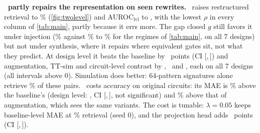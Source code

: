 \noindent\textbf{\ours\ partly repairs the representation on seen rewrites.} \ours\ raises restructured retrieval to
\OursTopRS\% (\cref{fig:twolevel}) and AUROC$_\mathrm{lvl}$ to \OursAUCHard, with the lowest $\rho$ in every column of \cref{tab:main}, partly because it errs more. The gap closed $g$
still favors it under injection (\OursGapInj\% against \BaseGapInj\% to \AugGapInj\% for the regimes of
\cref{tab:main}, on all 7 designs) but not under synthesis, where it repairs where equivalent gates sit, not what they predict.
At design level it beats the baseline by \DTTopOBDiff\ points (CI [\DTTopOBLo,\,\DTTopOBHi]) and
augmentation, TT-sim and circuit-level contrast by \DTTopOADiff, \DTTopOTDiff\ and \DTTopOCDiff{}, each on all 7 designs (all intervals above 0).
Simulation does better: 64-pattern signatures alone retrieve \SigRefSixtyFour\% of these pairs. \ours\ costs accuracy on original circuits: its MAE is
\OursMAECostPct\% above the baseline's (design level: \DTMaeOBDiff, CI [\DTMaeOBLo,\,\DTMaeOBHi], not significant) and
\OursMAECostAugPct\% above that of augmentation, which sees the same variants. The cost is tunable: $\lambda=0.05$
keeps baseline-level MAE at \LowLamTop\% retrieval (seed 0), and the projection head adds \NoHeadDiff\ points
(CI [\NoHeadLo,\,\NoHeadHi]).

